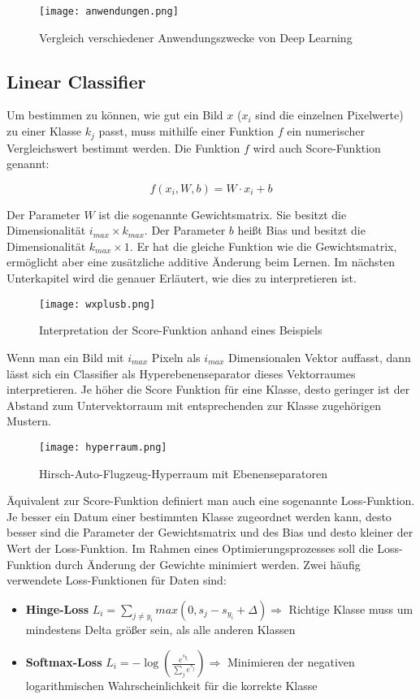 \documentclass[11pt,fleqn]{book}
\begin{document}
\begin{figure}[h]
\centering
\texttt{[image: anwendungen.png]}
\caption{Vergleich verschiedener Anwendungszwecke von Deep Learning}
\end{figure}

\newpage
\subsection{Linear Classifier}
Um bestimmen zu können, wie gut ein Bild $x$ ($x_i$ sind die einzelnen Pixelwerte) zu einer Klasse $k_j$ passt, muss mithilfe einer Funktion $f$ ein numerischer Vergleichswert bestimmt werden. Die Funktion $f$ wird auch Score-Funktion genannt:

\[f(x_i, W, b) = W \cdot x_i + b \]

Der Parameter $W$ ist die sogenannte Gewichtsmatrix. Sie besitzt die Dimensionalität $i_{max} \times k_{max}$.
Der Parameter $b$ heißt Bias und besitzt die Dimensionalität $k_{max} \times 1$. Er hat die gleiche Funktion wie die Gewichtsmatrix, ermöglicht aber eine zusätzliche additive Änderung beim Lernen. Im nächsten Unterkapitel wird die genauer Erläutert, wie dies zu interpretieren ist.

\begin{figure}[h]
\centering
\texttt{[image: wxplusb.png]}
\caption{Interpretation der Score-Funktion anhand eines Beispiels}
\end{figure}

Wenn man ein Bild mit $i_{max}$ Pixeln als $i_{max}$ Dimensionalen Vektor auffasst, dann lässt sich ein Classifier als Hyperebenenseparator dieses Vektorraumes interpretieren. Je höher die Score Funktion für eine Klasse, desto geringer ist der Abstand zum Untervektorraum mit entsprechenden zur Klasse zugehörigen Mustern.

\begin{figure}[h]
\centering
\texttt{[image: hyperraum.png]}
\caption{Hirsch-Auto-Flugzeug-Hyperraum mit Ebenenseparatoren}
\end{figure}

\newpage
Äquivalent zur Score-Funktion definiert man auch eine sogenannte Loss-Funktion. Je besser ein Datum einer bestimmten Klasse zugeordnet werden kann, desto besser sind die Parameter der Gewichtsmatrix und des Bias und desto kleiner der Wert der Loss-Funktion. Im Rahmen eines Optimierungsprozesses soll die Loss-Funktion durch Änderung der Gewichte minimiert werden.
\bigskip
Zwei häufig verwendete Loss-Funktionen für Daten sind:
\begin{itemize}
\item \textbf{Hinge-Loss} $L_i = \sum\limits_{j \neq y_i} max(0,s_j - s_{y_i} + \Delta) \Rightarrow$ Richtige Klasse muss um mindestens Delta größer sein, als alle anderen Klassen
\item \textbf{Softmax-Loss} $L_i = -\log(\frac{e^{s_{y_i}}}{\sum_{j} e^{s_j}}) \Rightarrow$ Minimieren der negativen logarithmischen Wahrscheinlichkeit für die korrekte Klasse
\end{itemize}
\end{document}
